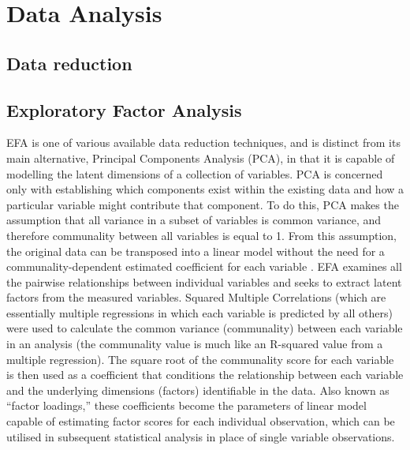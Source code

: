\section{Data Analysis\label{app8:dataAnalysis}}




\subsection{Data reduction\label{app8:dataReduction}}


\subsection{Exploratory Factor Analysis\label{app8:EFA}}
EFA is one of various available data reduction techniques, and is distinct from its main alternative, Principal Components Analysis (PCA), in that it is capable of modelling the latent dimensions of a collection of variables. PCA is concerned only with establishing which components exist within the existing data and how a particular variable might contribute that component. To do this, PCA makes the assumption that all variance in a subset of variables is common variance, and therefore communality between all variables is equal to 1. From this assumption, the original data can be transposed into a linear model without the need for a communality-dependent estimated coefficient for each variable \citep{Widaman2007}. EFA examines all the pairwise relationships between individual variables and seeks to extract latent factors from the measured variables.  Squared Multiple Correlations (which are essentially multiple regressions in which each variable is predicted by all others) were used to calculate the common variance (communality) between each variable in an analysis (the communality value is much like an R-squared value from a multiple regression).
The square root of the communality score for each variable is then used as a coefficient that conditions the relationship between each variable and the underlying dimensions (factors) identifiable in the data. Also known as ``factor loadings,'' these coefficients become the parameters of linear model capable of estimating factor scores for each individual observation, which can be utilised in subsequent statistical analysis in place of single variable observations.

